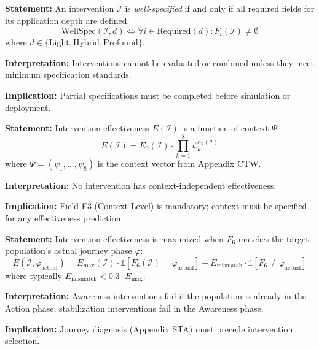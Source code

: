 \begin{tcolorbox}[colback=gray!5!white, colframe=gray!75!black,
    title=Axiom HHH-A1: Intervention Completeness]
\textbf{Statement:} An intervention $\mathcal{I}$ is \textit{well-specified} if and only if all required fields for its application depth are defined:
\begin{equation}
\text{WellSpec}(\mathcal{I}, d) \iff \forall i \in \text{Required}(d): F_i(\mathcal{I}) \neq \emptyset
\end{equation}
where $d \in \{\text{Light}, \text{Hybrid}, \text{Profound}\}$.

\textbf{Interpretation:} Interventions cannot be evaluated or combined unless they meet minimum specification standards.

\textbf{Implication:} Partial specifications must be completed before simulation or deployment.
\end{tcolorbox}

\begin{tcolorbox}[colback=gray!5!white, colframe=gray!75!black,
    title=Axiom HHH-A2: Context Dependency]
\textbf{Statement:} Intervention effectiveness $E(\mathcal{I})$ is a function of context $\Psi$:
\begin{equation}
E(\mathcal{I}) = E_0(\mathcal{I}) \cdot \prod_{k=1}^{8} \psi_k^{\alpha_k(\mathcal{I})}
\end{equation}
where $\Psi = (\psi_1, \ldots, \psi_8)$ is the context vector from Appendix CTW.

\textbf{Interpretation:} No intervention has context-independent effectiveness.

\textbf{Implication:} Field F3 (Context Level) is mandatory; context must be specified for any effectiveness prediction.
\end{tcolorbox}

\begin{tcolorbox}[colback=gray!5!white, colframe=gray!75!black,
    title=Axiom HHH-A3: Journey Phase Alignment]
\textbf{Statement:} Intervention effectiveness is maximized when $F_6$ matches the target population's actual journey phase $\varphi$:
\begin{equation}
E(\mathcal{I}, \varphi_{\text{actual}}) = E_{\max}(\mathcal{I}) \cdot \mathbb{1}[F_6(\mathcal{I}) = \varphi_{\text{actual}}] + E_{\text{mismatch}} \cdot \mathbb{1}[F_6 \neq \varphi_{\text{actual}}]
\end{equation}
where typically $E_{\text{mismatch}} < 0.3 \cdot E_{\max}$.

\textbf{Interpretation:} Awareness interventions fail if the population is already in the Action phase; stabilization interventions fail in the Awareness phase.

\textbf{Implication:} Journey diagnosis (Appendix STA) must precede intervention selection.
\end{tcolorbox}

